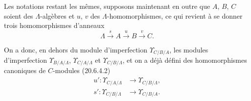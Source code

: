 \begin{env}[20.6.14]
\label{0.20.6.14-fr}
Les notations restant les mêmes, supposons maintenant en outre que $A$,
$B$, $C$ soient des $\Lambda$-algèbres et $u$, $v$ des
$\Lambda$-homomorphismes, ce qui revient à se donner trois homomorphismes
d'anneaux
\[
  \Lambda\xrightarrow{s}A\xrightarrow{u}B\xrightarrow{v}C.
\]

On a donc, en dehors du module d'imperfection $\Upsilon_{C/B/A}$, les
modules d'imperfection $\Upsilon_{B/A/\Lambda}$,
$\Upsilon_{C/A/\Lambda}$ et $\Upsilon_{C/B/\Lambda}$, et on a déjà défini
des homomorphismes canoniques de $C$-modules (20.6.4.2)
\begin{align}
\tag{20.6.14.1}
\label{0.20.6.14.1-fr}
  u':\Upsilon_{C/A/\Lambda}&\longrightarrow\Upsilon_{C/B/\Lambda},\\
\tag{20.6.14.2}
\label{0.20.6.14.2-fr}
  s':\Upsilon_{C/B/\Lambda}&\longrightarrow\Upsilon_{C/B/A}.
\end{align}


\end{env}
